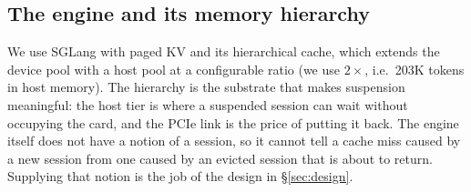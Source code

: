 \subsection{The engine and its memory hierarchy}

We use SGLang \cite{zheng2024sglang} with paged KV \cite{kwon2023pagedattention} and its
hierarchical cache, which extends the device pool with a host pool at a configurable ratio
(we use $2\times$, i.e.\ 203K tokens in host memory). The hierarchy is the substrate that
makes suspension meaningful: the host tier is where a suspended session can wait without
occupying the card, and the PCIe link is the price of putting it back. The engine itself
does not have a notion of a session, so it cannot tell a cache miss caused by a new
session from one caused by an evicted session that is about to return. Supplying that
notion is the job of the design in \S\ref{sec:design}.
